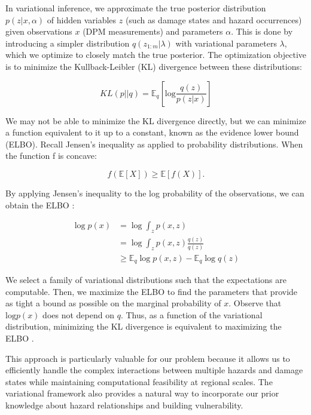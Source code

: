 \documentclass[review]{elsarticle}
\begin{document}
In variational inference, we approximate the true posterior distribution $p(z|x,\alpha)$ of hidden variables $z$ (such as damage states and hazard occurrences) given observations $x$ (DPM measurements) and parameters $\alpha$. This is done by introducing a simpler distribution $q(z_{1:m}|\lambda)$ with variational parameters $\lambda$, which we optimize to closely match the true posterior. The optimization objective is to minimize the Kullback-Leibler (KL) divergence between these distributions:

\begin{equation*}
    KL(p||q) = \mathbb{E}_{q}[\text{log}\frac{q(z)}{p(z|x)}]
\end{equation*}


We may not be able to minimize the KL divergence directly, but we can minimize a function equivalent to it up to a constant, known as the evidence lower bound (ELBO). Recall Jensen's inequality as applied to probability distributions. When the function f is concave:

\begin{equation*}
    f(\mathbb{E}[X]) \geq \mathbb{E}[f(X)].
\end{equation*}

By applying Jensen's inequality to the log probability of the observations, we can obtain the ELBO \cite{jordan1999introduction}:

\begin{equation} 
\begin{aligned}
\log p(x) & = \log \int_{z} p(x,z) \\
 & = \log \int_{z} p(x,z) \frac{q(z)}{q(z)}\\
 & \geq \mathbb{E}_{q}\log p(x,z) - \mathbb{E}_{q}\log q(z)
\end{aligned}
\end{equation}

We select a family of variational distributions such that the expectations are computable. Then, we maximize the ELBO to find the parameters that provide as tight a bound as possible on the marginal probability of $x$. Observe that $\text{log}p(x)$ does not depend on $q$. Thus, as a function of the variational distribution, minimizing the KL divergence is equivalent to maximizing the ELBO \cite{hoffman2013stochastic}.

This approach is particularly valuable for our problem because it allows us to efficiently handle the complex interactions between multiple hazards and damage states while maintaining computational feasibility at regional scales. The variational framework also provides a natural way to incorporate our prior knowledge about hazard relationships and building vulnerability.
\end{document}
